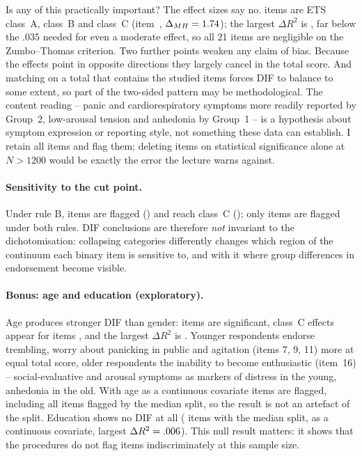 \documentclass[11pt,a4paper]{article}
\newcommand{\itemno}[1]{item~#1}
\begin{document}
Is any of this practically important? The effect sizes say no. \ETSA{} items are ETS
class~A, \ETSB{} class~B and \ETSC{} class~C (\itemno{\MaxDeltaMHItem},
$\Delta_{MH}=1.74$); the largest $\Delta R^2$ is \MaxdRtwo{}, far below the .035
needed for even a moderate effect, so all 21 items are negligible on the Zumbo--Thomas
criterion. Two further points weaken any claim of bias. Because the effects point in
opposite directions they largely cancel in the total score. And matching on a total that
contains the studied items forces DIF to balance to some extent, so part of the
two-sided pattern may be methodological. The content reading -- panic and cardiorespiratory
symptoms more readily reported by Group~2, low-arousal tension and anhedonia by Group~1 --
is a hypothesis about symptom expression or reporting style, not something these data
can establish. I retain all items and flag them; deleting items on statistical
significance alone at $N>1200$ would be exactly the error the lecture warns against.

\paragraph{Sensitivity to the cut point.} Under rule B, \DIFNSigB{} items are flagged
(\DIFSigB) and \ETSCNB{} reach class~C (\ETSCB); only items \DIFOverlapAB{} are flagged
under both rules. DIF conclusions are therefore \emph{not} invariant to the
dichotomisation: collapsing categories differently changes which region of the
continuum each binary item is sensitive to, and with it where group differences in
endorsement become visible.

\paragraph{Bonus: age and education (exploratory).} Age produces stronger DIF than
gender: \DIFAgeN{} items are significant, class~C effects appear for items
\DIFAgeETSC, and the largest $\Delta R^2$ is \DIFAgeMaxdR. Younger respondents endorse
trembling, worry about panicking in public and agitation (items 7, 9, 11) more at equal
total score, older respondents the inability to become enthusiastic (\itemno{16}) --
social-evaluative and arousal symptoms as markers of distress in the young, anhedonia
in the old. With age as a continuous covariate \DIFAgeContN{} items are flagged,
including all items flagged by the median split, so the result is not an artefact of
the split. Education shows no DIF at all (\DIFEduN{} items with the median split,
\DIFEduContN{} as a continuous covariate, largest $\Delta R^2=.006$). This null
result matters: it shows that the procedures do not flag items indiscriminately at this
sample size.
\end{document}
